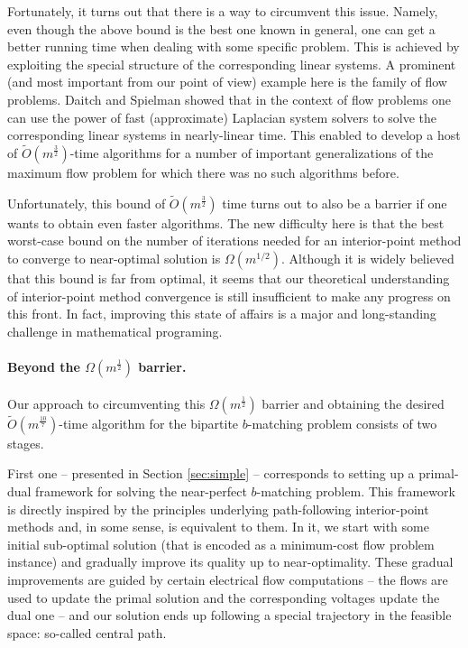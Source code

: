 \documentclass[11pt, letterpaper]{article}
\newcommand{\tO}[1]{\widetilde{O}(#1)}
\newcommand{\bb}{\boldsymbol{\mathit{b}}}
\begin{document}
Fortunately, it turns out that there is a way to circumvent this issue. Namely, even though the above bound is the best one known in general, one can get a better running time when dealing with some specific problem. This is achieved by exploiting the special structure of the corresponding linear systems. A prominent (and most important from our point of view) example here is the family of flow problems. Daitch and Spielman \cite{DaitchS08} showed that in the context of flow problems one can use the power of fast (approximate) Laplacian system solvers \cite{SpielmanTeng04,KoutisMP10,KoutisMP11,KelnerOSZ13} to solve the corresponding linear systems in nearly-linear time. This enabled \cite{DaitchS08} to develop a host of $\tO{m^{\frac{3}{2}}}$-time algorithms for a number of important generalizations of the maximum flow problem for which there was no such algorithms before. 

Unfortunately, this bound of $\tO{m^{\frac{3}{2}}}$ time turns out to also be  a barrier if one wants to obtain even faster algorithms. The new difficulty here is that the best worst-case bound on the number of iterations needed for an interior-point method to converge to near-optimal solution is $\Omega(m^{1/2})$. Although it is widely believed that this bound is far from optimal, it seems that our theoretical understanding of interior-point method convergence is still insufficient to make any progress on this front. In fact,  improving this state of affairs is a major and long-standing challenge in mathematical programing. 

\paragraph{Beyond the $\Omega(m^{\frac{1}{2}})$ barrier.}  Our approach to circumventing this $\Omega(m^{\frac{1}{2}})$ barrier and obtaining the desired $\tO{m^{\frac{10}{7}}}$-time algorithm for the bipartite $\bb$-matching problem consists of two stages.

First one -- presented in Section \ref{sec:simple} -- corresponds to setting up a primal-dual framework for solving the near-perfect $\bb$-matching problem. This framework is directly inspired by the principles underlying path-following interior-point methods and, in some sense, is equivalent to them. In it, we start with some initial sub-optimal solution (that is encoded as a minimum-cost flow problem instance) and gradually improve its quality up to near-optimality. These gradual improvements are guided by certain electrical flow computations -- the flows are used to update the primal solution and the corresponding voltages update the dual one -- and our solution ends up following a special trajectory in the feasible space: so-called central path. 
\end{document}
